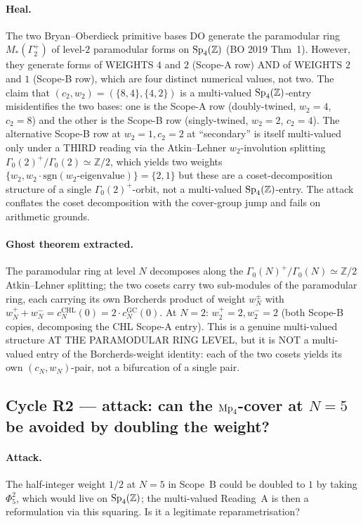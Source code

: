 \paragraph{Heal.} The two Bryan--Oberdieck primitive bases DO generate
the paramodular ring $M_*(\Gamma_2^+)$ of level-$2$ paramodular
forms on $\mathrm{Sp}_4(\mathbb Z)$ (BO 2019 Thm~1). However, they generate forms of
WEIGHTS $4$ and $2$ (Scope-A row) AND of WEIGHTS $2$ and $1$ (Scope-B
row), which are four distinct numerical values, not two. The claim
that $(c_2, w_2) = (\{8, 4\}, \{4, 2\})$ is a multi-valued
$\mathrm{Sp}_4(\mathbb Z)$-entry misidentifies the two bases: one is the Scope-A row
(doubly-twined, $w_2 = 4$, $c_2 = 8$) and the other is the Scope-B
row (singly-twined, $w_2 = 2$, $c_2 = 4$). The alternative Scope-B
row at $w_2 = 1, c_2 = 2$ at ``secondary'' is itself multi-valued
only under a THIRD reading via the Atkin--Lehner $w_2$-involution
splitting $\Gamma_0(2)^+ / \Gamma_0(2) \simeq \mathbb Z/2$, which
yields two weights $\{w_2, w_2 \cdot \mathrm{sgn}(w_2\text{-eigenvalue})\}
= \{2, 1\}$ but these are a coset-decomposition structure of a single
$\Gamma_0(2)^+$-orbit, not a multi-valued $\mathrm{Sp}_4(\mathbb Z)$-entry. The attack
conflates the coset decomposition with the cover-group jump and
fails on arithmetic grounds.

\paragraph{Ghost theorem extracted.} The paramodular ring at level $N$
decomposes along the $\Gamma_0(N)^+ / \Gamma_0(N) \simeq \mathbb Z/2$
Atkin--Lehner splitting; the two cosets carry two sub-modules of the
paramodular ring, each carrying its own Borcherds product of weight
$w_N^{\pm}$ with $w_N^+ + w_N^- = c_N^{\mathrm{CHL}}(0) = 2 \cdot
c_N^{\mathrm{GC}}(0)$. At $N = 2$: $w_2^+ = 2, w_2^- = 2$ (both
Scope-B copies, decomposing the CHL Scope-A entry). This is a
genuine multi-valued structure AT THE PARAMODULAR RING LEVEL, but it
is NOT a multi-valued entry of the Borcherds-weight identity: each of
the two cosets yields its own $(c_N, w_N)$-pair, not a bifurcation of
a single pair.

\subsection*{Cycle R2 --- attack: can the $\mathrm{Mp}_4$-cover at $N = 5$
be avoided by doubling the weight?}

\paragraph{Attack.} The half-integer weight $1/2$ at $N = 5$ in
Scope~B could be doubled to $1$ by taking $\Phi_5^2$, which would live
on $\mathrm{Sp}_4(\mathbb Z)$; the multi-valued Reading~A is then a reformulation
via this squaring. Is it a legitimate reparametrisation?

